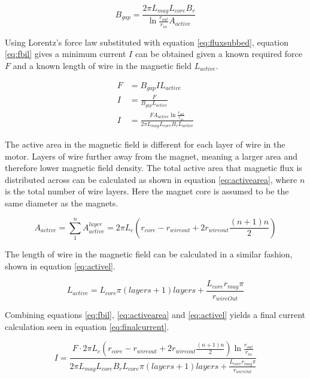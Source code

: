 \documentclass[a4paper,12pt]{article}
\begin{document}
\begin{equation}\label{eq:fluxsubbed}
    B_{gap} = \frac{2\pi L_{mag} L_{core} B_r}{\ln{\frac{r_{out}}{r_{in}}}A_{active}}
\end{equation}

Using Lorentz's force law substituted with equation \ref{eq:fluxsubbed}, equation \ref{eq:fbil} gives a minimum current $I$ can be obtained given a known required force $F$ and a known length of wire in the magnetic field $L_{active}$.

\begin{equation}\label{eq:fbil}
    \begin{split}
        F & = B_{gap}IL_{active}\\
        I & = \frac{F}{B_{gap}L_{active}}\\
        I & = \frac{F A_{active} \ln{\frac{r_{out}}{r_{in}}}}{2\pi L_{mag} L_{core} B_r L_{active}}
    \end{split}
\end{equation}

The active area in the magnetic field is different for each layer of wire in the motor. Layers of wire further away from the magnet, meaning a larger area and therefore lower magnetic field density. The total active area that magnetic flux is distributed across can be calculated as shown in equation \ref{eq:activearea}, where $n$ is the total number of wire layers. Here the magnet core is assumed to be the same diameter as the magnets.

\begin{equation}\label{eq:activearea}
    A_{active} = \sum_{1}^{n}{A_{active}^{layer}} = 2\pi L_c (r_{core}-r_{wireout} + 2r_{wireout} \frac{(n+1)n}{2})
\end{equation}

The length of wire in the magnetic field can be calculated in a similar fashion, shown in equation \ref{eq:activel}.

\begin{equation}\label{eq:activel}
    L_{active} = L_{core}\pi(layers+1)layers + \frac{L_{core} r_{mag} \pi}{r_{wireOut}}
\end{equation}

Combining equations \ref{eq:fbil}, \ref{eq:activearea} and \ref{eq:activel} yields a final current calculation seen in equation \ref{eq:finalcurrent}.

\begin{equation}\label{eq:finalcurrent}
    I = \frac{F\cdot 2\pi L_c (r_{core}-r_{wireout} + 2r_{wireout} \frac{(n+1)n}{2}) \ln{\frac{r_{out}}{r_{in}}}}{2\pi L_{mag} L_{core} B_r L_{core}\pi(layers+1)layers + \frac{L_{core} r_{mag} \pi}{r_{wireOut}}}
\end{equation}
\end{document}
